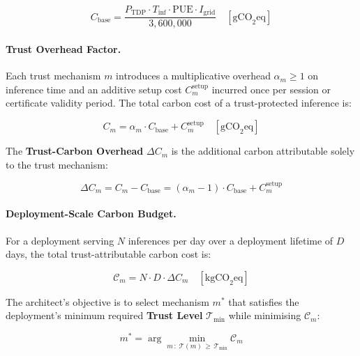 \begin{equation}
  \label{eq:baseline-carbon}
  C_{\mathrm{base}}
    = \frac{P_{\mathrm{TDP}} \cdot T_{\mathrm{inf}}
            \cdot \mathrm{PUE}
            \cdot I_{\mathrm{grid}}}{3{,}600{,}000}
    \quad [\text{gCO}_2\text{eq}]
\end{equation}

\paragraph{Trust Overhead Factor.}
Each trust mechanism $m$ introduces a multiplicative overhead
$\alpha_m \geq 1$ on inference time and an additive setup cost
$C_m^{\mathrm{setup}}$ incurred once per session or certificate
validity period.
The total carbon cost of a trust-protected inference is:

\begin{equation}
  \label{eq:trust-carbon}
  C_m
    = \alpha_m \cdot C_{\mathrm{base}}
    + C_m^{\mathrm{setup}}
    \quad [\text{gCO}_2\text{eq}]
\end{equation}

The \textbf{Trust-Carbon Overhead} $\Delta C_m$ is the additional
carbon attributable solely to the trust mechanism:

\begin{equation}
  \label{eq:trust-overhead}
  \Delta C_m
    = C_m - C_{\mathrm{base}}
    = (\alpha_m - 1)\cdot C_{\mathrm{base}}
    + C_m^{\mathrm{setup}}
\end{equation}

\paragraph{Deployment-Scale Carbon Budget.}
For a deployment serving $N$ inferences per day over a
deployment lifetime of $D$ days, the total trust-attributable
carbon cost is:

\begin{equation}
  \label{eq:total-carbon}
  \mathcal{C}_m
    = N \cdot D \cdot \Delta C_m
    \quad [\text{kgCO}_2\text{eq}]
\end{equation}

The architect's objective is to select mechanism $m^*$ that
satisfies the deployment's minimum required \textbf{Trust Level}
$\mathcal{T}_{\min}$ while minimising $\mathcal{C}_m$:

\begin{equation}
  \label{eq:trust-optimisation}
  m^*
    = \arg\min_{m\,:\;\mathcal{T}(m)\,\geq\,\mathcal{T}_{\min}}
      \mathcal{C}_m
\end{equation}

